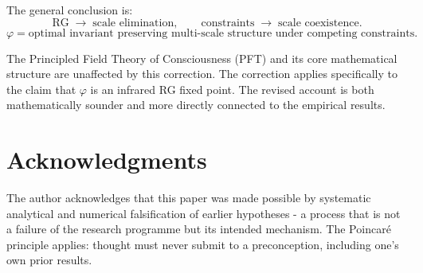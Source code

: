 \documentclass[11pt,a4paper]{article}
\theoremstyle{plain}
\theoremstyle{definition}
\newcommand{\phiGolden}{\varphi}
\begin{document}
The general conclusion is:
\begin{equation}
\text{RG} \;\rightarrow\; \text{scale elimination}, \qquad
\text{constraints} \;\rightarrow\; \text{scale coexistence}.
\end{equation}
\begin{equation}
\phiGolden = \text{optimal invariant preserving multi-scale structure
under competing constraints.}
\end{equation}

The Principled Field Theory of Consciousness (PFT) and its core mathematical
structure are unaffected by this correction. The correction applies
specifically to the claim that $\phiGolden$ is an infrared RG fixed point.
The revised account is both mathematically sounder and more directly
connected to the empirical results.

\section*{Acknowledgments}

The author acknowledges that this paper was made possible by systematic
analytical and numerical falsification of earlier hypotheses - a process
that is not a failure of the research programme but its intended mechanism.
The Poincaré principle applies: thought must never submit to a
preconception, including one's own prior results.
\end{document}
